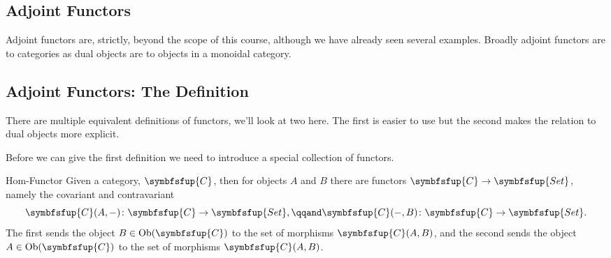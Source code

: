 \documentclass[fleqn]{NotesClass}
\makeatletter
\newcommand{\cat}[1]{\symbfsfup{#1}}
\newcommand{\c@egory}[1]{\symbfsfup{#1}}
\newcommand{\Set}{\c@egory{Set}}
\DeclareMathOperator{\Ob}{Ob}
\makeatother
\begin{document}
    
    
    
    
    
    
    
    
    
    
    \appendixpage
    \begin{appendices}
        
        \chapter{Adjoint Functors}
        Adjoint functors are, strictly, beyond the scope of this course, although we have already seen several examples.
        Broadly adjoint functors are to categories as dual objects are to objects in a monoidal category.
        
        \section{Adjoint Functors: The Definition}
        There are multiple equivalent definitions of functors, we'll look at two here.
        The first is easier to use but the second makes the relation to dual objects more explicit.
        
        Before we can give the first definition we need to introduce a special collection of functors.
        \begin{dfn}{Hom-Functor}{}
            Given a category, \(\cat{C}\), then for objects \(A\) and \(B\) there are functors \(\cat{C} \to \Set\), namely the covariant and contravariant 
            \begin{equation}
                \cat{C}(A, -) \colon \cat{C} \to \Set, \qqand \cat{C}(-, B) \colon \cat{C} \to \Set.
            \end{equation}
            The first sends the object \(B \in \Ob(\cat{C})\) to the set of morphisms \(\cat{C}(A, B)\), and the second sends the object \(A \in \Ob(\cat{C})\) to the set of morphisms \(\cat{C}(A, B)\).
            

\end{dfn}
\end{appendices}
\end{document}

